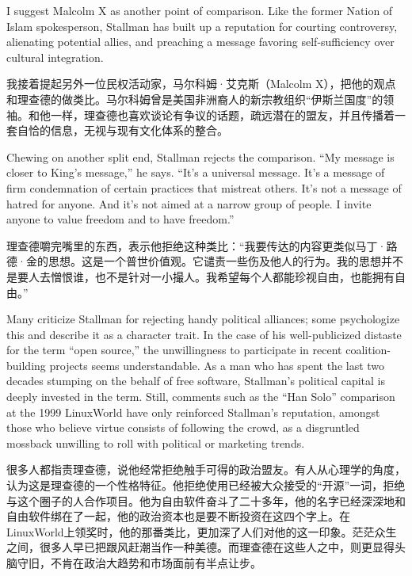 \ifdefined\eng
I suggest Malcolm X as another point of comparison. Like the former Nation of Islam spokesperson, Stallman has built up a reputation for courting controversy, alienating potential allies, and preaching a message favoring self-sufficiency over cultural integration.
\fi

\ifdefined\chs
我接着提起另外一位民权活动家，马尔科姆·艾克斯（Malcolm X），把他的观点和理查德的做类比。马尔科姆曾是美国非洲裔人的新宗教组织“伊斯兰国度”的领袖。和他一样，理查德也喜欢谈论有争议的话题，疏远潜在的盟友，并且传播着一套自恰的信息，无视与现有文化体系的整合。
\fi

\ifdefined\eng
Chewing on another split end, Stallman rejects the comparison. ``My message is closer to King's message,'' he says. ``It's a universal message. It's a message of firm condemnation of certain practices that mistreat others. It's not a message of hatred for anyone. And it's not aimed at a narrow group of people. I invite anyone to value freedom and to have freedom.''
\fi

\ifdefined\chs
理查德嚼完嘴里的东西，表示他拒绝这种类比：“我要传达的内容更类似马丁·路德·金的思想。这是一个普世价值观。它谴责一些伤及他人的行为。我的思想并不是要人去憎恨谁，也不是针对一小撮人。我希望每个人都能珍视自由，也能拥有自由。”
\fi

\ifdefined\eng
Many criticize Stallman for rejecting handy political alliances; some psychologize this and describe it as a character trait. In the case of his well-publicized distaste for the term ``open source,'' the unwillingness to participate in recent coalition-building projects seems understandable. As a man who has spent the last two decades stumping on the behalf of free software, Stallman's political capital is deeply invested in the term. Still, comments such as the ``Han Solo'' comparison at the 1999 LinuxWorld have only reinforced Stallman's reputation, amongst those who believe virtue consists of following the crowd, as a disgruntled mossback unwilling to roll with political or marketing trends.
\fi

\ifdefined\chs
很多人都指责理查德，说他经常拒绝触手可得的政治盟友。有人从心理学的角度，认为这是理查德的一个性格特征。他拒绝使用已经被大众接受的“开源”一词，拒绝与这个圈子的人合作项目。他为自由软件奋斗了二十多年，他的名字已经深深地和自由软件绑在了一起，他的政治资本也是要不断投资在这四个字上。在LinuxWorld上领奖时，他的那番类比，更加深了人们对他的这一印象。茫茫众生之间，很多人早已把跟风赶潮当作一种美德。而理查德在这些人之中，则更显得头脑守旧，不肯在政治大趋势和市场面前有半点让步。
\fi

